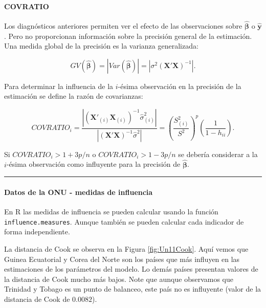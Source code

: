 \documentclass[
]{article}
\begin{document}
\hypertarget{covratio}{%
\paragraph{COVRATIO}\label{covratio}}

Los diagnósticos anteriores permiten ver el efecto de las observaciones sobre \(\hat{\boldsymbol \beta}\) o \(\hat{\boldsymbol y}\). Pero no proporcionan información sobre la precisión general de la estimación. Una medida global de la precisión es la varianza generalizada:

\[ GV(\hat{\boldsymbol \beta}) = | Var(\hat {\boldsymbol \beta}) | = |\sigma^{2}(\boldsymbol X'\boldsymbol X)^{-1}|.\]

Para determinar la influencia de la \(i\)-ésima observación en la precisión de la estimación se define la razón de covarianzas:

\[
COVRATIO_{i} = \frac{|(\boldsymbol X'_{(i)}\boldsymbol X_{(i)})^{-1}\hat{\sigma}_{(i)}^{2}|}{| (\boldsymbol X'\boldsymbol X)^{-1}\hat{\sigma}^{2} |}= \left( \frac{S^{2}_{(i)}}{S^{2}} \right)^{p} \left( \frac{1}{1-h_{ii}} \right).
\]

Si \(COVRATIO_{i} > 1 + 3p/n\) o \(COVRATIO_{i} > 1 - 3p/n\) se debería considerar a la \(i\)-ésima observación como influyente para la precisión de \(\widehat{\boldsymbol \beta}\).

\rule{\textwidth}{0.4pt}

\hypertarget{datos-de-la-onu---medidas-de-influencia}{%
\paragraph*{Datos de la ONU - medidas de influencia}\label{datos-de-la-onu---medidas-de-influencia}}

En R las medidas de influencia se pueden calcular usando la función \texttt{influence.measures}. Aunque también se pueden calcular cada indicador de forma independiente.

La distancia de Cook se observa en la Figura \ref{fig:Un11Cook}. Aquí vemos que Guinea Ecuatorial y Corea del Norte son los países que más influyen en las estimaciones de los parámetros del modelo. Lo demás países presentan valores de la distancia de Cook mucho más bajos. Note que aunque observamos que Trinidad y Tobago es un punto de balanceo, este país no es influyente (valor de la distancia de Cook de \(0.0082\)).
\end{document}
